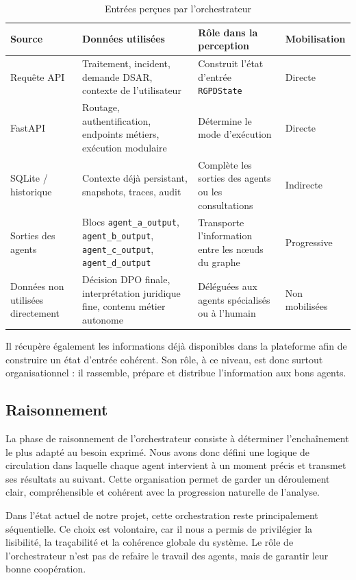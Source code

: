 \documentclass[12pt,a4paper]{report}
\begin{document}
\begin{table}[H]
\centering
\caption{Entrées perçues par l'orchestrateur}
\label{tab:perception_orchestrateur}
\begin{tabularx}{\textwidth}{|p{3cm}|X|X|p{2.7cm}|}
\hline
\textbf{Source} & \textbf{Données utilisées} & \textbf{Rôle dans la perception} & \textbf{Mobilisation} \\
\hline
Requête API & Traitement, incident, demande DSAR, contexte de l'utilisateur & Construit l'état d'entrée \texttt{RGPDState} & Directe \\
\hline
FastAPI & Routage, authentification, endpoints métiers, exécution modulaire & Détermine le mode d'exécution & Directe \\
\hline
SQLite / historique & Contexte déjà persistant, snapshots, traces, audit & Complète les sorties des agents ou les consultations & Indirecte \\
\hline
Sorties des agents & Blocs \texttt{agent\_a\_output}, \texttt{agent\_b\_output}, \texttt{agent\_c\_output}, \texttt{agent\_d\_output} & Transporte l'information entre les nœuds du graphe & Progressive \\
\hline
Données non utilisées directement & Décision DPO finale, interprétation juridique fine, contenu métier autonome & Déléguées aux agents spécialisés ou à l'humain & Non mobilisées \\
\hline
\end{tabularx}
\end{table}

Il récupère également les informations déjà disponibles dans la plateforme afin de construire un état d'entrée cohérent. Son rôle, à ce niveau, est donc surtout organisationnel : il rassemble, prépare et distribue l'information aux bons agents.

\subsection{Raisonnement}

La phase de raisonnement de l'orchestrateur consiste à déterminer l'enchaînement le plus adapté au besoin exprimé. Nous avons donc défini une logique de circulation dans laquelle chaque agent intervient à un moment précis et transmet ses résultats au suivant. Cette organisation permet de garder un déroulement clair, compréhensible et cohérent avec la progression naturelle de l'analyse.

Dans l'état actuel de notre projet, cette orchestration reste principalement séquentielle. Ce choix est volontaire, car il nous a permis de privilégier la lisibilité, la traçabilité et la cohérence globale du système. Le rôle de l'orchestrateur n'est pas de refaire le travail des agents, mais de garantir leur bonne coopération.
\end{document}

